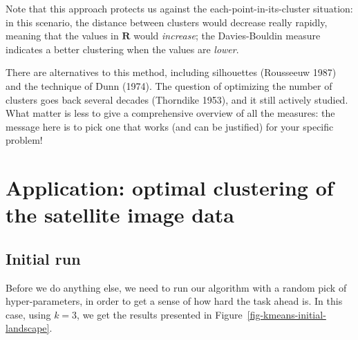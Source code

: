 \documentclass[
  letterpaper,
]{scrbook}
\begin{document}
Note that this approach protects us against the
each-point-in-its-cluster situation: in this scenario, the distance
between clusters would decrease really rapidly, meaning that the values
in \(\mathbf{R}\) would \emph{increase}; the Davies-Bouldin measure
indicates a better clustering when the values are \emph{lower}.


There are alternatives to this method, including silhouettes (Rousseeuw
1987) and the technique of Dunn (1974). The question of optimizing the
number of clusters goes back several decades (Thorndike 1953), and it
still actively studied. What matter is less to give a comprehensive
overview of all the measures: the message here is to pick one that works
(and can be justified) for your specific problem!

\section{Application: optimal clustering of the satellite image
data}\label{application-optimal-clustering-of-the-satellite-image-data}

\subsection{Initial run}\label{sec-kmeans-initial}

Before we do anything else, we need to run our algorithm with a random
pick of hyper-parameters, in order to get a sense of how hard the task
ahead is. In this case, using \(k = 3\), we get the results presented in
Figure~\ref{fig-kmeans-initial-landscape}.
\end{document}
